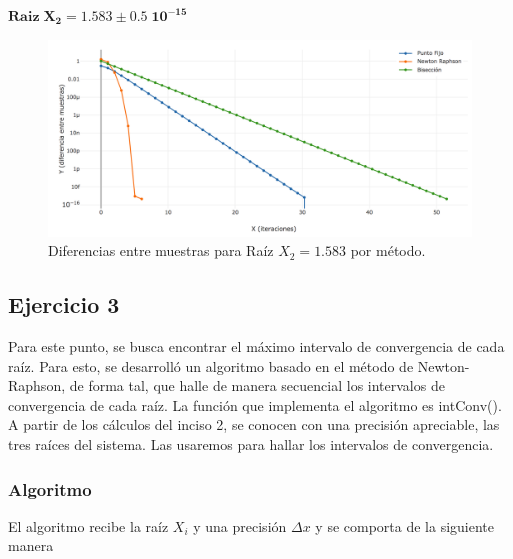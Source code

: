 \documentclass[10pt,a4paper]{article}
\begin{document}
$\mathbf{Raiz\; X_{2} = 1.583 \pm0.5\;10^{-15}}$
\begin{figure}[H]
\begin{centering}
\includegraphics[width=15cm]{ej2-r3.png}
\end{centering}
\caption{Diferencias entre muestras para Raíz $X_{2} = 1.583$ por método.}
\end{figure}


\subsection{Ejercicio 3}
Para este punto, se busca encontrar el máximo intervalo de convergencia de cada raíz. Para esto, se desarrolló un algoritmo basado en el método de Newton-Raphson, de forma tal, que halle de manera secuencial los intervalos de convergencia de cada raíz. La función que implementa el algoritmo es intConv().\\

A partir de los cálculos del inciso 2, se conocen con una precisión apreciable, las tres raíces del sistema. Las usaremos para hallar los intervalos de convergencia.\\

\subsubsection{Algoritmo}

El algoritmo recibe la raíz $X_{i}$ y una precisión $\Delta x$ y se comporta de la siguiente manera
\end{document}
